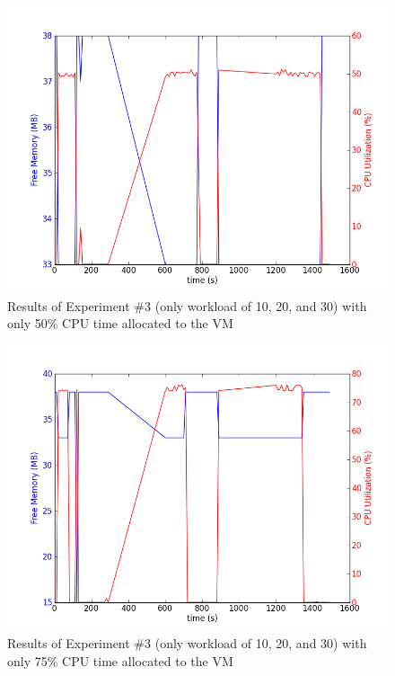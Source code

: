\documentclass{article}
\begin{document}
  \begin{figure}
    \begin{center}
      \includegraphics[scale=0.50]{ex4Cap=50.png} 
      \caption{Results of Experiment \#3 (only workload of 10, 20, and
      30) with only 50\% CPU time allocated to the VM}
      \label{fig:ex4CPU50}
    \end{center}
  \end{figure}

  \begin{figure}
    \begin{center}
      \includegraphics[scale=0.50]{ex4Cap=75.png} 
      \caption{Results of Experiment \#3 (only workload of 10, 20, and
      30) with only 75\% CPU time allocated to the VM}
      \label{fig:ex4CPU75}
    \end{center}
  \end{figure}
\end{document}
